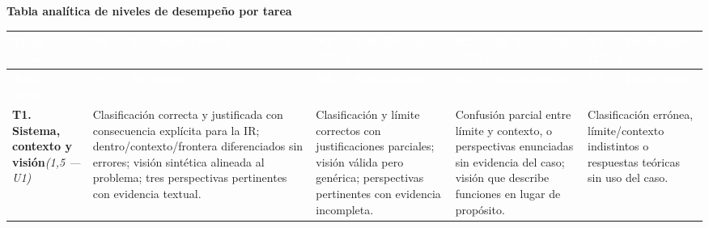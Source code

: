\documentclass[11pt]{article}
\renewcommand{\arraystretch}{1.25}
\begin{document}
\begin{landscape}
\thispagestyle{fancy}
\begin{center}
{\large\textbf{\textcolor{utegreendk}{Tabla analítica de niveles de desempeño por tarea}}}
\end{center}
\vspace{1pt}
{\scriptsize
\renewcommand{\arraystretch}{1.08}
\setlength{\tabcolsep}{3pt}

\begin{longtable}{|L{3.2cm}|L{5.6cm}|L{5.3cm}|L{4.9cm}|L{4.3cm}|}
\hline
{}
\textcolor{white}{\textbf{Tarea (peso)}} &
\textcolor{white}{\textbf{N4 — Excelente (100\%)}} &
\textcolor{white}{\textbf{N3 — Satisfactorio (75\%)}} &
\textcolor{white}{\textbf{N2 — En desarrollo (50\%)}} &
\textcolor{white}{\textbf{N1 — Insuficiente (25\%)}} \\
\hline
\endfirsthead
\hline
{}
\textcolor{white}{\textbf{Tarea (peso)}} &
\textcolor{white}{\textbf{N4 — Excelente}} &
\textcolor{white}{\textbf{N3 — Satisfactorio}} &
\textcolor{white}{\textbf{N2 — En desarrollo}} &
\textcolor{white}{\textbf{N1 — Insuficiente}} \\
\hline
\endhead

\textbf{T1. Sistema, contexto y visión}\newline\textit{(1{,}5 — U1)} &
Clasificación correcta y justificada con consecuencia explícita para la IR; dentro/contexto/frontera diferenciados sin errores; visión sintética alineada al problema; tres perspectivas pertinentes con evidencia textual. &
Clasificación y límite correctos con justificaciones parciales; visión válida pero genérica; perspectivas pertinentes con evidencia incompleta. &
Confusión parcial entre límite y contexto, o perspectivas enunciadas sin evidencia del caso; visión que describe funciones en lugar de propósito. &
Clasificación errónea, límite/contexto indistintos o respuestas teóricas sin uso del caso. \\
\hline


\end{longtable}}
\end{landscape}
\end{document}

